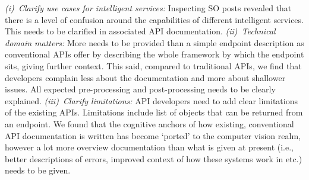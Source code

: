 \textit{(i)~Clarify use cases for intelligent services:} Inspecting SO posts revealed that there is a level of confusion around the capabilities of different intelligent services. This needs to be clarified in associated API documentation. 
\textit{(ii)~Technical domain matters:} More needs to be provided than a simple endpoint description as conventional APIs offer by describing the whole framework by which the endpoint sits, giving further context. This said, compared to traditional APIs, we find that developers complain less about the documentation and more about shallower issues. All expected pre-processing and post-processing needs to be clearly explained.
\textit{(iii)~Clarify limitations:} API developers need to add clear limitations of the existing APIs. Limitations include list of objects that can be returned from an endpoint.  We found that the cognitive anchors of how existing, conventional API documentation is written has become `ported' to the computer vision realm, however a lot more overview documentation than what is given at present (i.e., better descriptions of errors, improved context of how these systems work in etc.) needs to be given.







